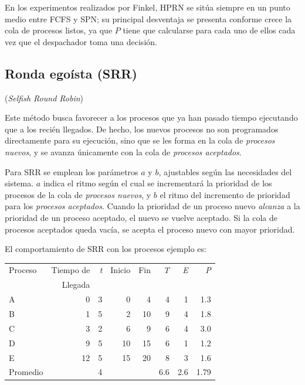 \documentclass[11pt,fleqn]{book} %
\begin{document}
En los experimentos realizados por Finkel, HPRN se sitúa siempre en
un punto medio entre FCFS y SPN; su principal desventaja se presenta
conforme crece la cola de procesos listos, ya que $P$ tiene que
calcularse para cada uno de ellos cada vez que el despachador toma una
decisión.
\subsection{Ronda egoísta (SRR)}
\label{sec-4-2-5}


(\emph{Selfish Round Robin})

Este método busca favorecer a los procesos que ya han pasado tiempo
ejecutando que a los recién llegados. De hecho, los nuevos procesos
no son programados directamente para su ejecución, sino que se les
forma en la cola de \emph{procesos nuevos}, y se avanza únicamente con la
cola de \emph{procesos aceptados}.

Para SRR se emplean los parámetros $a$ y $b$, ajustables según las
necesidades del sistema. $a$ indica el ritmo según el cual se
incrementará la prioridad de los procesos de la cola de \emph{procesos nuevos}, y $b$ el ritmo del incremento de prioridad para los \emph{procesos aceptados}. Cuando la prioridad de un proceso nuevo \emph{alcanza} a la
prioridad de un proceso aceptado, el nuevo se vuelve aceptado. Si la
cola de procesos aceptados queda vacía, se acepta el proceso nuevo con
mayor prioridad.

El comportamiento de SRR con los procesos ejemplo es:


\begin{center}
\begin{tabular}{lrrrrrrr}
 Proceso   &  Tiempo de  &  \emph{t}  &  Inicio  &  Fin  &  \emph{T}  &  \emph{E}  &  \emph{P}  \\
           &    Llegada  &            &          &       &            &            &            \\
\hline
 A         &          0  &         3  &       0  &    4  &         4  &         1  &       1.3  \\
 B         &          1  &         5  &       2  &   10  &         9  &         4  &       1.8  \\
 C         &          3  &         2  &       6  &    9  &         6  &         4  &       3.0  \\
 D         &          9  &         5  &      10  &   15  &         6  &         1  &       1.2  \\
 E         &         12  &         5  &      15  &   20  &         8  &         3  &       1.6  \\
\hline
 Promedio  &             &         4  &          &       &       6.6  &       2.6  &      1.79  \\
\end{tabular}
\end{center}
\end{document}
